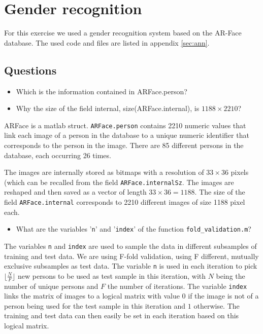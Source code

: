 \section{Gender recognition}

For this exercise we used a gender recognition system based on the AR-Face database. The used code and files are listed in appendix \ref{sec:ann}.

\subsection{Questions}

\question

\begin{itemize}
	\item Which is the information contained in ARFace.person?
	\item Why the size of the field internal, size(ARFace.internal), is $ 1188 \times 2210 $?
\end{itemize}

ARFace is a matlab struct. \texttt{ARFace.person} contains 2210 numeric values that link each image of a person in the database to a unique numeric identifier that corresponds to the person in the image. There are 85 different persons in the database, each occurring 26 times. 

The images are internally stored as bitmaps with a resolution of $33 \times 36$ pixels (which can be recalled from the field \texttt{ARFace.internalSz}. The images are reshaped and then saved as a vector of length $33 \times 36 = 1188 $. The size of the field \texttt{ARFace.internal} corresponds to 2210 different images of size 1188 pixel each. \newline


\question

\begin{itemize}
	\item What are the variables '\texttt{n}' and '\texttt{index}' of the function \texttt{fold\_validation.m}?
\end{itemize} 

The variables \texttt{n} and \texttt{index} are used to sample the data in different subsamples of training and test data. We are using F-fold validation, using F different, mutually exclusive subsamples as test data. The variable \texttt{n} is used in each iteration to pick $ \lfloor\frac{N}{F}\rfloor $ new persons to be used as test sample in this iteration, with $N$ being the number of unique persons and $F$ the number of iterations. The variable \texttt{index} links the matrix of images to a logical matrix with value $ 0 $ if the image is not of a person being used for the test sample in this iteration and $ 1 $ otherwise. The training and test data can then easily be set in each iteration based on this logical matrix. 

